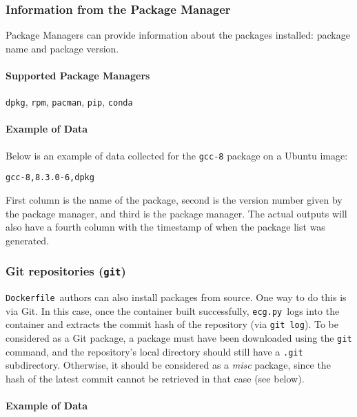 \documentclass{article}
\newcommand{\dfile}{\texttt{Dockerfile}}
\newcommand{\ecg}{\texttt{ecg.py}}
\begin{document}
\subsubsection{Information from the Package Manager}\label{sec:package_managers}

Package Managers can provide information about the packages installed: package name and package version.

\paragraph{Supported Package Managers} \texttt{dpkg}, \texttt{rpm}, \texttt{pacman}, \texttt{pip}, \texttt{conda}

\paragraph{Example of Data}

Below is an example of data collected for the \texttt{gcc-8} package on a Ubuntu image:

\begin{lstlisting}
gcc-8,8.3.0-6,dpkg
\end{lstlisting}

First column is the name of the package, second is the version number given by the package manager, and third is the package manager. The actual outputs will also have a fourth column with the timestamp of when the package list was generated.

\subsubsection{Git repositories (\texttt{git})}\label{sec:git}

\dfile\ authors can also install packages from source.
One way to do this is via Git.
In this case, once the container built successfully, \ecg\ logs into the container and extracts the commit hash of the repository (via \texttt{git log}).
To be considered as a Git package, a package must have been downloaded using the \verb|git| command, and the repository's local directory should still have a \verb|.git| subdirectory. Otherwise, it should be considered as a \textit{misc} package, since the hash of the latest commit cannot be retrieved in that case (see below).

\paragraph{Example of Data}
\end{document}
